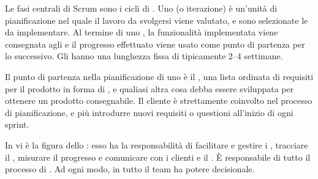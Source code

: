 Le fasi centrali di Scrum sono i cicli di . Uno  (o iterazione) è un'unità di pianificazione nel quale il lavoro da svolgersi viene valutato, e sono selezionate le  da implementare. Al termine di uno , la funzionalità implementata viene consegnata agli  e il progresso effettuato viene usato come punto di partenza per lo  successivo. Gli  hanno una lunghezza fissa di tipicamente 2--4 settimane.

Il punto di partenza nella pianificazione di uno  è il , una lista ordinata di requisiti per il prodotto in forma di ,  e qualiasi altra cosa debba essere sviluppata per ottenere un prodotto consegnabile. Il cliente è strettamente coinvolto nel processo di pianificazione, e più introdurre nuovi requisiti o questioni all'inizio di ogni sprint.

In  vi è la figura dello : esso ha la responsabilità di facilitare e gestire i , tracciare il , misurare il progresso e comunicare con i clienti e il . È responsabile di tutto il processo di . Ad ogni modo, in  tutto il team ha potere decisionale.

